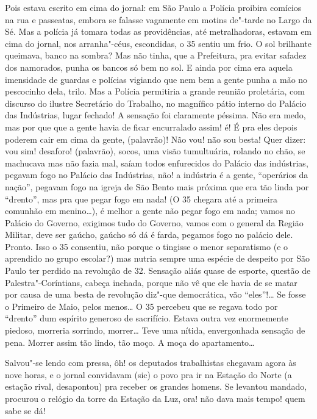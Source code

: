 \begin{linenumbers}
Pois estava escrito em cima do jornal: em São Paulo a Polícia proibira
comícios na rua e passeatas, embora se falasse vagamente em motins
de"-tarde no Largo da Sé. Mas a polícia já tomara todas as providências,
até metralhadoras, estavam em cima do jornal, nos arranha"-céus,
escondidas, o 35 sentiu um frio. O sol brilhante queimava, banco na
sombra? Mas não tinha, que a Prefeitura, pra evitar safadez dos
namorados, punha os bancos só bem no sol. E ainda por cima era aquela
imensidade de guardas e polícias vigiando que nem bem a gente punha a
mão no pescocinho dela, trilo. Mas a Polícia permitiria a grande reunião
proletária, com discurso do ilustre Secretário do Trabalho, no magnífico
pátio interno do Palácio das Indústrias, lugar fechado! A sensação foi
claramente péssima. Não era medo, mas por que que a gente havia de ficar
encurralado assim! é! É pra eles depois poderem cair em cima da gente,
(palavrão)! Não vou! não sou besta! Quer dizer: vou sim! desaforo!
(palavrão), socos, uma visão tumultuária, rolando no chão, se machucava
mas não fazia mal, saíam todos enfurecidos do Palácio das indústrias,
pegavam fogo no Palácio das Indústrias, não! a indústria é a gente,
``operários da nação'', pegavam fogo na igreja de São Bento mais próxima
que era tão linda por ``drento'', mas pra que pegar fogo em nada! (O 35
chegara até a primeira comunhão em menino\ldots{}), é melhor a gente não
pegar fogo em nada; vamos no Palácio do Governo, exigimos tudo do
Governo, vamos com o general da Região Militar, deve ser gaúcho, gaúcho
só dá é farda, pegamos fogo no palácio dele. Pronto. Isso o 35
consentiu, não porque o tingisse o menor separatismo (e o aprendido no
grupo escolar?) mas nutria sempre uma espécie de despeito por São Paulo
ter perdido na revolução de 32. Sensação aliás quase de esporte, questão
de Palestra"-Coríntians, cabeça inchada, porque não vê que ele havia de
se matar por causa de uma besta de revolução diz"-que democrática, vão
``eles''!\ldots{} Se fosse o Primeiro de Maio, pelos menos\ldots{} O 35 percebeu
que se regava todo por ``drento'' dum espírito generoso de sacrifício.
Estava outra vez enormemente piedoso, morreria sorrindo, morrer\ldots{} Teve
uma nítida, envergonhada sensação de pena. Morrer assim tão lindo, tão
moço. A moça do apartamento\ldots{}

Salvou"-se lendo com pressa, ôh! os deputados trabalhistas chegavam agora
às nove horas, e o jornal convidavam (sic) o povo pra ir na Estação do
Norte (a estação rival, desapontou) pra receber os grandes homens. Se
levantou mandado, procurou o relógio da torre da Estação da Luz, ora!
não dava mais tempo! quem sabe se dá!


\end{linenumbers}
